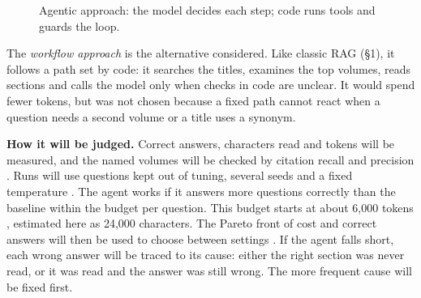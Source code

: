 \documentclass[11pt,a4paper]{article}
\newcommand\code[1]{\texttt{#1}}
\newcommand\lead[1]{\vspace{-\parskip}\textbf{#1}}
\begin{document}
\begin{figure}[!ht]\centering
{}
\caption{Agentic approach: the model decides each step; code runs tools and guards the loop.}\label{fig:agentic}
\end{figure}

The \emph{workflow approach} is the alternative considered. Like classic RAG (\S1), it follows a path set by
code: it searches the titles, examines the top volumes, reads sections and calls the model only when
checks in code are unclear. It would spend fewer tokens, but was not chosen because a fixed path cannot
react when a question needs a second volume or a title uses a synonym.

\lead{How it will be judged.} Correct answers, characters read and tokens will be measured, and the named
volumes will be checked by citation recall and precision \parencite{gao2023enabling}. Runs will use questions
kept out of tuning, several seeds and a fixed temperature \parencite{hochlehnert2025sober,course-s3}. The agent
works if it answers more questions correctly than the baseline within the budget per question. This budget
starts at about 6,000 tokens \parencite{joren2025sufficient}, estimated here as 24,000 characters. The Pareto
front of cost and correct answers will then be used to choose between settings \parencite{kapoor2024ai}. If the
agent falls short, each wrong answer will be traced to its cause: either the right section was never read, or
it was read and the answer was still wrong. The more frequent cause will be fixed first.
\end{document}
